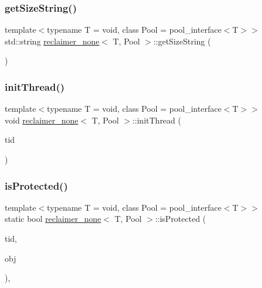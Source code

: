 \subsubsection{\texorpdfstring{get\+Size\+String()}{getSizeString()}}
{\footnotesize\ttfamily template$<$typename T  = void, class Pool  = pool\+\_\+interface$<$\+T$>$$>$ \\
std\+::string \hyperlink{classreclaimer__none}{reclaimer\+\_\+none}$<$ T, Pool $>$\+::get\+Size\+String (\begin{DoxyParamCaption}{ }\end{DoxyParamCaption})\hspace{0.3cm}{\ttfamily [inline]}}

\mbox{\label{classreclaimer__none_a16e9b3199168e6715744f108382e083c}} 
\subsubsection{\texorpdfstring{init\+Thread()}{initThread()}}
{\footnotesize\ttfamily template$<$typename T  = void, class Pool  = pool\+\_\+interface$<$\+T$>$$>$ \\
void \hyperlink{classreclaimer__none}{reclaimer\+\_\+none}$<$ T, Pool $>$\+::init\+Thread (\begin{DoxyParamCaption}\item[{const int}]{tid }\end{DoxyParamCaption})\hspace{0.3cm}{\ttfamily [inline]}}

\mbox{\label{classreclaimer__none_a6515f01a73ccddf44303256344f7996f}} 
\subsubsection{\texorpdfstring{is\+Protected()}{isProtected()}}
{\footnotesize\ttfamily template$<$typename T  = void, class Pool  = pool\+\_\+interface$<$\+T$>$$>$ \\
static bool \hyperlink{classreclaimer__none}{reclaimer\+\_\+none}$<$ T, Pool $>$\+::is\+Protected (\begin{DoxyParamCaption}\item[{const int}]{tid,  }\item[{T $\ast$const}]{obj }\end{DoxyParamCaption})\hspace{0.3cm}{\ttfamily [inline]}, {\ttfamily [static]}}

